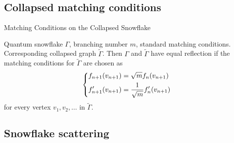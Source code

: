 \documentclass{beamer}
\begin{document}
  \subsection[Collapsed MC]{Collapsed matching conditions}

  \begin{frame}{Matching Conditions on the Collapsed Snowflake}
    \begin{theorem}
      Quantum snowflake $\Gamma$, branching number $m$, standard matching conditions. Corresponding collapsed graph $\widetilde{\Gamma}$. Then $\Gamma$ and $\widetilde{\Gamma}$ have equal reflection if the matching conditions for $\widetilde{\Gamma}$ are chosen as
      \begin{equation*}
        \begin{dcases}
          f_{n+1}(v_{n+1}) = \sqrt{m} f_n(v_{n+1}) \\
          f'_{n+1}(v_{n+1}) = \frac{1}{\sqrt{m}} f'_n(v_{n+1})
        \end{dcases}
      \end{equation*}
      for every vertex $v_1,v_2,\ldots$ in $\widetilde{\Gamma}$.
    \end{theorem}
  \end{frame}


  \subsection{Snowflake scattering}
\end{document}
